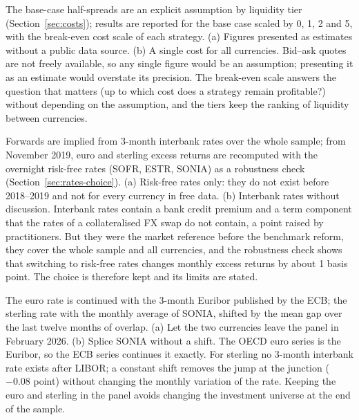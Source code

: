 {The base-case half-spreads are an explicit assumption by liquidity tier (Section~\ref{sec:costs}); results are reported for the base case scaled by 0, 1, 2 and 5, with the break-even cost scale of each strategy.}
{(a) Figures presented as estimates without a public data source. (b) A single cost for all currencies.}
{Bid--ask quotes are not freely available, so any single figure would be an assumption; presenting it as an estimate would overstate its precision. The break-even scale answers the question that matters (up to which cost does a strategy remain profitable?) without depending on the assumption, and the tiers keep the ranking of liquidity between currencies.}

{Forwards are implied from 3-month interbank rates over the whole sample; from November 2019, euro and sterling excess returns are recomputed with the overnight risk-free rates (SOFR, ESTR, SONIA) as a robustness check (Section~\ref{sec:rates-choice}).}
{(a) Risk-free rates only: they do not exist before 2018--2019 and not for every currency in free data. (b) Interbank rates without discussion.}
{Interbank rates contain a bank credit premium and a term component that the rates of a collateralised FX swap do not contain, a point raised by practitioners. But they were the market reference before the benchmark reform, they cover the whole sample and all currencies, and the robustness check shows that switching to risk-free rates changes monthly excess returns by about 1 basis point. The choice is therefore kept and its limits are stated.}

{The euro rate is continued with the 3-month Euribor published by the ECB; the sterling rate with the monthly average of SONIA, shifted by the mean gap over the last twelve months of overlap.}
{(a) Let the two currencies leave the panel in February 2026. (b) Splice SONIA without a shift.}
{The OECD euro series is the Euribor, so the ECB series continues it exactly. For sterling no 3-month interbank rate exists after LIBOR; a constant shift removes the jump at the junction ($-0.08$ point) without changing the monthly variation of the rate. Keeping the euro and sterling in the panel avoids changing the investment universe at the end of the sample.}


